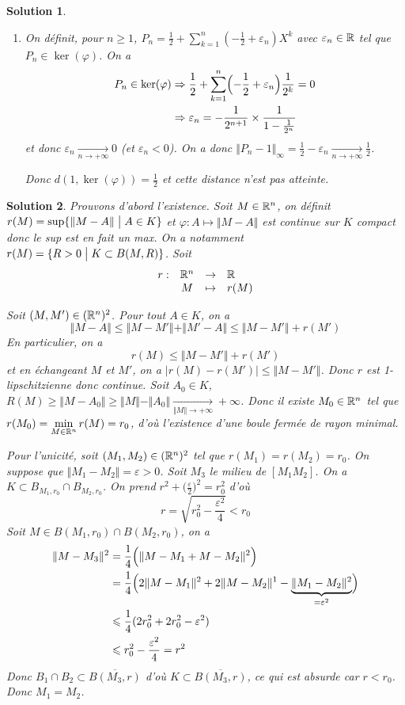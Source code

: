 \documentclass[12pt]{article}
\newtheorem{solution}{Solution}[section]
\theoremstyle{remark}
\newcommand{\function}[5]{
	$$
	\begin{array}{rccl}
		#1: & #2 & \to & #3 \\
		& #4 & \mapsto & #5
	\end{array}
	$$
}
\numberwithin{equation}{section}
\begin{document}
\begin{solution}
\begin{enumerate}
		\item On définit, pour $n\geqslant1$, $P_{n}=\frac{1}{2}+\sum_{k=1}^{n}(-\frac{1}{2}+\varepsilon_{n})X^{k}$ avec $\varepsilon_{n}\in\mathbb{R}$ tel que $P_{n}\in\ker(\varphi)$. On a 
		\begin{align*}
			P_{n}\in\ker(\varphi)
			&\Rightarrow\frac{1}{2}+\sum_{k=1}^{n}\Bigl(-\frac{1}{2}+\varepsilon_{n}\Bigr)\frac{1}{2^{k}}=0\\
			&\Rightarrow\varepsilon_{n}=-\frac{1}{2^{n+1}}\times \frac{1}{1-\frac{1}{2^{n}}}
		\end{align*}
		et donc $\varepsilon_{n}\xrightarrow[n\to+\infty]{}0$ (et $\varepsilon_{n}<0$). On a donc $\Vert P_{n}-1\Vert_{\infty}=\frac{1}{2}-\varepsilon_{n}\xrightarrow[n\to+\infty]{}\frac{1}{2}$.

		Donc $d(1,\ker(\varphi))=\frac{1}{2}$ et cette distance n'est pas atteinte.
	\end{enumerate}
\end{solution}

\begin{solution}
	Prouvons d'abord l'existence. Soit $M\in\mathbb{R}^{n}$, on définit $r(M)=\sup\{\Vert M-A\Vert\bigm| A\in K\}$ et $\varphi\colon A\mapsto\Vert M-A\Vert$ est continue sur $K$ compact donc le sup est en fait un max. On a notamment $r(M)=\{R>0\bigm| K\subset B(M,R)\}$. Soit \function{r}{\R^n}{\R}{M}{r(M)}
	Soit $(M,M')\in(\mathbb{R}^{n})^{2}$. Pour tout $A\in K$, on a 
	$$\Vert M-A\Vert\leqslant\Vert M-M'\Vert+\Vert M'-A\Vert\leqslant\Vert M-M'\Vert +r(M')$$
	En particulier, on a
	$$r(M)\leqslant\Vert M-M'\Vert+r(M')$$
	et en échangeant $M$ et $M'$, on a $\vert r(M)-r(M')\vert\leqslant\Vert M-M'\Vert$. Donc $r$ est 1-lipschitzienne donc continue. Soit $A_{0}\in K$, $R(M)\geqslant\Vert M-A_{0}\Vert\geqslant\Vert M\Vert-\Vert A_{0}\Vert\xrightarrow[\Vert M\Vert\to+\infty]{}+\infty$. Donc il existe $M_{0}\in\mathbb{R}^{n}$ tel que $r(M_{0})=\min\limits_{M\in\mathbb{R}^{n}}r(M)=r_{0}$, d'où l'existence d'une boule fermée de rayon minimal.

	Pour l'unicité, soit $(M_{1},M_{2})\in(\mathbb{R}^{n})^{2}$ tel que $r(M_{1})=r(M_{2})=r_{0}$. On suppose que $\Vert M_{1}-M_{2}\Vert=\varepsilon>0$. Soit $M_{3}$ le milieu de $[M_{1}M_{2}]$. On a $K\subset B_{M_{1},r_{0}}\cap B_{M_{2},r_{0}}$. On prend $r^{2}+\bigl(\frac{\varepsilon}{2}\bigr)^{2}=r_{0}^{2}$ d'où 
	$$r=\sqrt{r_{0}^{2}-\frac{\varepsilon^{2}}{4}}<r_{0}$$
	Soit $M\in B(M_{1},r_{0})\cap B(M_{2},r_{0})$, on a 
	\begin{align*}
		\Vert M-M_{3}\Vert^{2}
		&=\frac{1}{4}\Bigl(\Vert M-M_{1}+M-M_{2}\Vert^{2}\Bigr)\\
		&=\frac{1}{4}\Bigl(2\Vert M-M_{1}\Vert^{2}+2\Vert M-M_{2}\Vert^{1}-\underbrace{\Vert M_{1}-M_{2}\Vert^{2}}_{=\varepsilon^{2}}\Bigr)\\
		&\leqslant\frac{1}{4}(2r_{0}^{2}+2r_{0}^{2}-\varepsilon^{2})\\
		&\leqslant r_{0}^{2}-\frac{\varepsilon^{2}}{4}=r^{2}
	\end{align*}
	Donc $B_{1}\cap B_{2}\subset\overline{B(M_{3},r)}$ d'où $K\subset\overline{B(M_{3},r)}$, ce qui est absurde car $r<r_{0}$. Donc $M_{1}=M_{2}$.
\end{solution}
\end{document}
